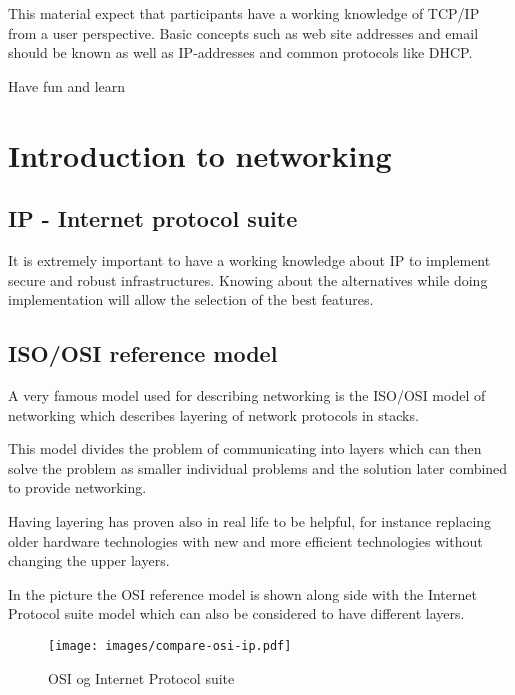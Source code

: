 \documentclass[a4paper,11pt,notitlepage]{report}
\begin{document}
This material expect that participants have a working knowledge of
TCP/IP from a user perspective. Basic concepts such as web site addresses and email should be known as well as IP-addresses and common protocols like DHCP.

\vskip 1cm
Have fun and learn
\eject

\rhead{\fancyplain{}{\bf \chaptername\ \thechapter}}



\chapter*{\color{titlecolor}Introduction to networking}
\label{chap:intro}

\section*{\color{titlecolor}IP - Internet protocol suite}

It is extremely important to have a working knowledge about IP to implement
secure and robust infrastructures. Knowing about the alternatives while doing
implementation will allow the selection of the best features.

\section*{\color{titlecolor}ISO/OSI reference model}
A very famous model used for describing networking is the ISO/OSI model
of networking which describes layering of network protocols in stacks.

This model divides the problem of communicating into layers which can
then solve the problem as smaller individual problems and the solution
later combined to provide networking.

Having layering has proven also in real life to be helpful, for instance
replacing older hardware technologies with new and more efficient technologies
without changing the upper layers.

In the picture the OSI reference model is shown along side with
the Internet Protocol suite model which can also be considered to have different layers.


\begin{figure}[H]
\label{fig:osi}
\begin{center}
\colorbox{white}{\texttt{[image: images/compare-osi-ip.pdf]}}
\end{center}
\caption{OSI og Internet Protocol suite}
\end{figure}
\end{document}
